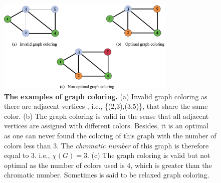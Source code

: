 \documentclass[%
 reprint,
nofootinbib,
 amsmath,amssymb,
 aps,
pra,
floatfix,
]{revtex4-2}
\begin{document}
\begin{figure}[ht!]
    \centering
    \includegraphics[width=8.5cm]{picture/color_matching.png}
    \caption{\textbf{The examples of graph coloring.} (a) Invalid graph coloring as there are adjacent vertices , i.e., \{(2,3),(3,5)\}, that share the same color. (b) The graph coloring is valid in the sense that all adjacent vertices are assigned with different colors. Besides, it is an optimal as one can never found the coloring of this graph with the number of colors less than 3. The \emph{chromatic number} of this graph is therefore equal to 3. i.e., $\chi(G)=3$. (c) The graph coloring is valid but not optimal as the number of colors used is 4, which is greater than the chromatic number. Sometimes is said to be relaxed graph coloring.} 
    \label{fig:graph_coloring}
\end{figure}\\
\end{document}
